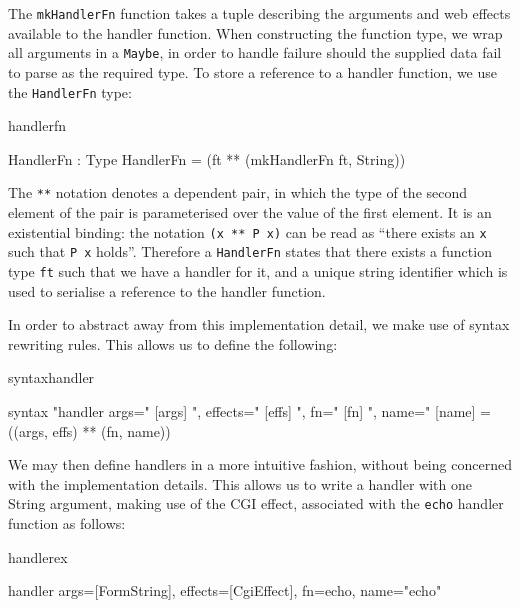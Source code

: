 

\noindent
The \texttt{mkHandlerFn} function takes a tuple describing the arguments and
web effects available to the handler function. When constructing the function
type, we wrap all arguments in a \texttt{Maybe}, in order to handle
failure should the supplied data fail to parse as the required type.
%
To store a reference to a handler function, we use the \texttt{HandlerFn} type:

\begin{SaveVerbatim}{handlerfn}

HandlerFn : Type
HandlerFn = (ft ** (mkHandlerFn ft, String))

\end{SaveVerbatim}

\noindent
The \texttt{**} notation denotes a dependent pair, in which the type of the second
element of the pair is parameterised over the value of the first element. It is
an existential binding:
the notation \texttt{(x ** P x)} can be read as ``there exists an \texttt{x} such that 
\texttt{P x} holds''.
Therefore a \texttt{HandlerFn} states that there exists a function type
\texttt{ft} such that we have a handler for it, and a unique string identifier
which is used to serialise a
reference to the handler function. 

In order to abstract away from this implementation detail, we make use of
\idris{} syntax rewriting rules. This allows us to define the following:

\noindent
\begin{SaveVerbatim}{syntaxhandler}

syntax 
  "handler args=" [args] ", effects=" [effs] ", fn=" [fn] 
  ", name=" [name] = ((args, effs) ** (fn, name))

\end{SaveVerbatim}

\noindent
We may then define handlers in a more intuitive fashion, without being
concerned with the implementation details. This allows us to write a handler
with one String argument, making use of the CGI effect, associated with the
\texttt{echo} handler function as follows:

\begin{SaveVerbatim}{handlerex}

handler args=[FormString], 
        effects=[CgiEffect], 
        fn=echo, 
        name="echo"

\end{SaveVerbatim}

